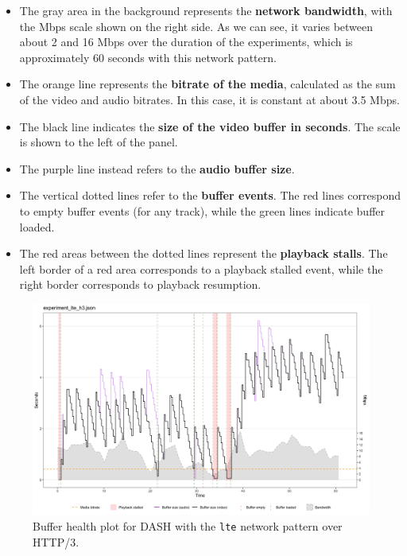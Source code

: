 \begin{itemize}
    \item The gray area in the background represents the \textbf{network bandwidth}, with the Mbps scale shown on the right side. As we can see, it varies between about 2 and 16 Mbps over the duration of the experiments, which is approximately 60 seconds with this network pattern.
    \item The orange line represents the \textbf{bitrate of the media}, calculated as the sum of the video and audio bitrates. In this case, it is constant at about 3.5 Mbps.
    \item The black line indicates the \textbf{size of the video buffer in seconds}. The scale is shown to the left of the panel.
    \item The purple line instead refers to the \textbf{audio buffer size}.
    \item The vertical dotted lines refer to the \textbf{buffer events}. The red lines correspond to empty buffer events (for any track), while the green lines indicate buffer loaded.
    \item The red areas between the dotted lines represent the \textbf{playback stalls}. The left border of a red area corresponds to a playback stalled event, while the right border corresponds to playback resumption.
\end{itemize}

\begin{figure}[h]
    \centering
    \includegraphics[width=\textwidth]{res/eval_nonabr_lte_h3.png}
    \caption{Buffer health plot for DASH with the \texttt{lte} network pattern over HTTP/3.}
    \label{fig:eval_nonabr_lte_h3}
\end{figure}

